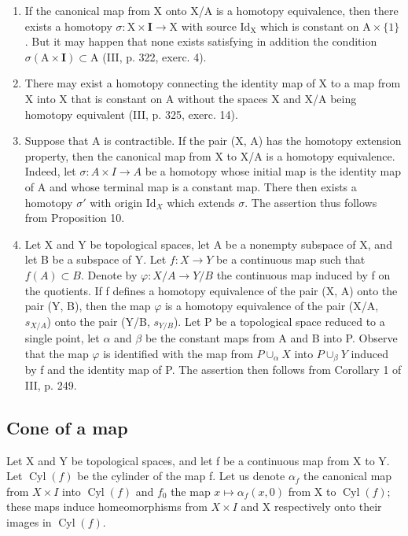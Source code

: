 \begin{enumerate}
\def\labelenumi{\arabic{enumi})}
\item
  If the canonical map from X onto X/A is a homotopy equivalence, then there exists a homotopy \(\sigma\colon\mathrm{X}\times\mathbf{I}\to\mathrm{X}\) with source \(\mathrm{Id}_{\mathrm{X}}\) which is constant on \(\mathrm{A}\times\{1\}\). But it may happen that none exists satisfying in addition the condition \(\sigma(\mathrm{A}\times\mathbf{I})\subset\mathrm{A}\) (III, p. 322, exerc. 4).
\item
  There may exist a homotopy connecting the identity map of X to a map from X into X that is constant on A without the spaces X and X/A being homotopy equivalent (III, p. 325, exerc. 14).
\item
  Suppose that A is contractible. If the pair (X, A) has the homotopy extension property, then the canonical map from X to X/A is a homotopy equivalence. Indeed, let \(\sigma\colon A \times I \to A\) be a homotopy whose initial map is the identity map of A and whose terminal map is a constant map. There then exists a homotopy \(\sigma'\) with origin \(\mathrm{Id}_{X}\) which extends \(\sigma\). The assertion thus follows from Proposition 10.
\item
  Let X and Y be topological spaces, let A be a nonempty subspace of X, and let B be a subspace of Y. Let \(f: X \to Y\) be a continuous map such that \(f(A) \subset B\). Denote by \(\varphi: X/A \to Y/B\) the continuous map induced by f on the quotients. If f defines a homotopy equivalence of the pair (X, A) onto the pair (Y, B), then the map \(\varphi\) is a homotopy equivalence of the pair (X/A, \(s_{X/A}\)) onto the pair (Y/B, \(s_{Y/B}\)). Let P be a topological space reduced to a single point, let \(\alpha\) and \(\beta\) be the constant maps from A and B into P. Observe that the map \(\varphi\) is identified with the map from \(P \cup_{\alpha} X\) into \(P \cup_{\beta} Y\) induced by f and the identity map of P. The assertion then follows from Corollary 1 of III, p. 249.
\end{enumerate}

\subsection{Cone of a map}

Let X and Y be topological spaces, and let f be a continuous map from X to Y. Let \(\operatorname{Cyl}(f)\) be the cylinder of the map f. Let us denote \(\alpha_{f}\) the canonical map from \(X \times I\) into \(\operatorname{Cyl}(f)\) and \(f_{0}\) the map \(x \mapsto \alpha_{f}(x,0)\) from X to \(\operatorname{Cyl}(f)\); these maps induce homeomorphisms from \(X \times I\) and X respectively onto their images in \(\operatorname{Cyl}(f)\).

